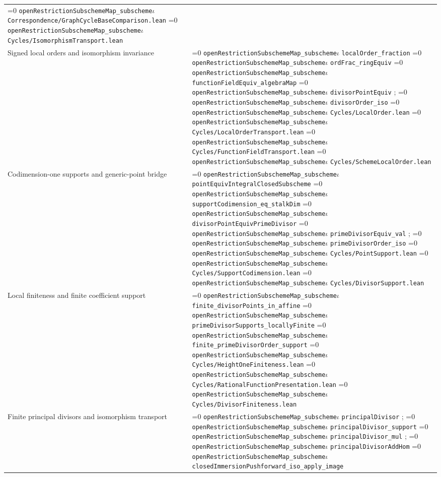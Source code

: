 \documentclass[11pt]{article}
\theoremstyle{definition}
\theoremstyle{remark}
\newcommand{\leanpath}[1]{%
  \ifnum\pdfstrcmp{\detokenize{#1}}%
      {\detokenize{openRestrictionSubschemeMap_subschemeι}}=0
    \texttt{\nolinkurl{openRestrictionSubschemeMap_subscheme}}\ensuremath{\iota}%
  \else
    \texttt{\nolinkurl{#1}}%
  \fi}
\begin{document}
\begin{longtable}{@{}>{\raggedright\arraybackslash}p{}
                >{\raggedright\arraybackslash}p{}@{}}
\leanpath{Correspondence/GraphCycleBaseComparison.lean}\newline
\leanpath{Cycles/IsomorphismTransport.lean}\\
Signed local orders and isomorphism invariance &
\leanpath{localOrder_fraction}\newline
\leanpath{ordFrac_ringEquiv}\newline
\leanpath{functionFieldEquiv_algebraMap}\newline
\leanpath{divisorPointEquiv}; \leanpath{divisorOrder_iso}\newline
\leanpath{Cycles/LocalOrder.lean}\newline
\leanpath{Cycles/LocalOrderTransport.lean}\newline
\leanpath{Cycles/FunctionFieldTransport.lean}\newline
\leanpath{Cycles/SchemeLocalOrder.lean}\\
Codimension-one supports and generic-point bridge &
\leanpath{pointEquivIntegralClosedSubscheme}\newline
\leanpath{supportCodimension_eq_stalkDim}\newline
\leanpath{divisorPointEquivPrimeDivisor}\newline
\leanpath{primeDivisorEquiv_val}; \leanpath{primeDivisorOrder_iso}\newline
\leanpath{Cycles/PointSupport.lean}\newline
\leanpath{Cycles/SupportCodimension.lean}\newline
\leanpath{Cycles/DivisorSupport.lean}\\
Local finiteness and finite coefficient support &
\leanpath{finite_divisorPoints_in_affine}\newline
\leanpath{primeDivisorSupports_locallyFinite}\newline
\leanpath{finite_primeDivisorOrder_support}\newline
\leanpath{Cycles/HeightOneFiniteness.lean}\newline
\leanpath{Cycles/RationalFunctionPresentation.lean}\newline
\leanpath{Cycles/DivisorFiniteness.lean}\\
Finite principal divisors and isomorphism transport &
\leanpath{principalDivisor}; \leanpath{principalDivisor_support}\newline
\leanpath{principalDivisor_mul}; \leanpath{principalDivisorAddHom}\newline
\leanpath{closedImmersionPushforward_iso_apply_image}\newline

\end{longtable}
\end{document}
